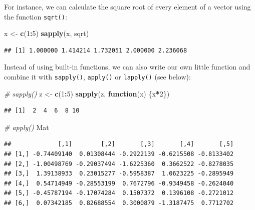 \documentclass[
]{book}
\newenvironment{Shaded}{\begin{snugshade}}{\end{snugshade}}
\newcommand{\CommentTok}[1]{\textcolor[rgb]{0.56,0.35,0.01}{\textit{#1}}}
\newcommand{\ControlFlowTok}[1]{\textcolor[rgb]{0.13,0.29,0.53}{\textbf{#1}}}
\newcommand{\DecValTok}[1]{\textcolor[rgb]{0.00,0.00,0.81}{#1}}
\newcommand{\FunctionTok}[1]{\textcolor[rgb]{0.13,0.29,0.53}{\textbf{#1}}}
\newcommand{\NormalTok}[1]{#1}
\newcommand{\OtherTok}[1]{\textcolor[rgb]{0.56,0.35,0.01}{#1}}
\newcommand{\SpecialCharTok}[1]{\textcolor[rgb]{0.81,0.36,0.00}{\textbf{#1}}}
\begin{document}
For instance, we can calculate the square root of every element of a vector using the function \texttt{sqrt()}:

\begin{Shaded}
\begin{Highlighting}[]
\NormalTok{x }\OtherTok{\textless{}{-}} \FunctionTok{c}\NormalTok{(}\DecValTok{1}\SpecialCharTok{:}\DecValTok{5}\NormalTok{)}
\FunctionTok{sapply}\NormalTok{(x, sqrt)}
\end{Highlighting}
\end{Shaded}

\begin{verbatim}
## [1] 1.000000 1.414214 1.732051 2.000000 2.236068
\end{verbatim}

Instead of using built-in functions, we can also write our own little function and combine it with \texttt{sapply()}, \texttt{apply()} or \texttt{lapply()} (see below):

\begin{Shaded}
\begin{Highlighting}[]
\CommentTok{\# sapply()}
\NormalTok{z }\OtherTok{\textless{}{-}} \FunctionTok{c}\NormalTok{(}\DecValTok{1}\SpecialCharTok{:}\DecValTok{5}\NormalTok{)}
\FunctionTok{sapply}\NormalTok{(z, }\ControlFlowTok{function}\NormalTok{(x) \{x}\SpecialCharTok{*}\DecValTok{2}\NormalTok{\}) }
\end{Highlighting}
\end{Shaded}

\begin{verbatim}
## [1]  2  4  6  8 10
\end{verbatim}

\begin{Shaded}
\begin{Highlighting}[]
\CommentTok{\# apply()}
\NormalTok{Mat }
\end{Highlighting}
\end{Shaded}

\begin{verbatim}
##             [,1]        [,2]       [,3]       [,4]       [,5]
## [1,] -0.74409140  0.01308444 -0.2922139 -0.6215508 -0.8133402
## [2,] -1.00498769 -0.29037494 -1.6225360  0.3662522 -0.8278035
## [3,]  1.39138933  0.23015277 -0.5958387  1.0623225 -0.2895949
## [4,]  0.54714949 -0.28553199  0.7672796 -0.9349458 -0.2624040
## [5,] -0.45787194 -0.17074284  0.1507372  0.1396108 -0.2721012
## [6,]  0.07342185  0.82688554  0.3000879 -1.3187475  0.7712702
\end{verbatim}
\end{document}
